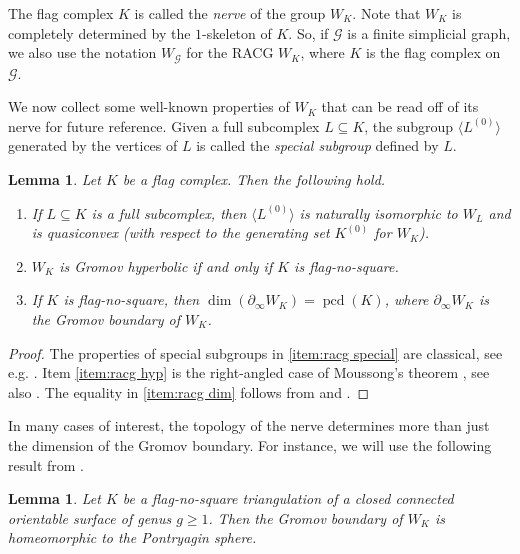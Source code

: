 \documentclass{amsart}
\theoremstyle{plain}
\newtheorem{lemma}[theorem]{Lemma}
\theoremstyle{definition}
\theoremstyle{remark}
\numberwithin{equation}{section}
\newcommand{\pcd}{\operatorname{pcd}}
\newcommand{\grbd}{\partial_\infty} %
\renewcommand{\geq}{\geqslant}
\begin{document}
The flag complex $K$ is called the \textit{nerve} of the group $W_K$. 
Note that $W_K$ is completely determined by the $1$-skeleton of $K$. 
So, if $\mathscr{G}$ is a finite simplicial graph, we also use the notation $W_{\mathscr{G}}$ for the RACG $W_K$, where $K$ is the flag complex on $\mathscr{G}$.


We now collect some well-known properties of $W_K$ that can be read off of its nerve for future reference.
Given a full subcomplex  $L\subseteq K$, the subgroup  $\langle L^{(0)} \rangle$ generated by the vertices of $L$ is called the \textit{special subgroup} defined by $L$.
\begin{lemma}\label{lem:racg}
    Let $K$ be a flag complex. Then the following hold.
    \begin{enumerate}
    \item \label{item:racg special} If $L\subseteq K$ is a  full subcomplex, then $\langle L^{(0)}\rangle$ is naturally isomorphic to $W_L$ and is quasiconvex (with respect to the generating set $K^{(0)}$ for $W_K$).
    
    \item \label{item:racg hyp} $W_K$ is Gromov hyperbolic if and only if $K$ is flag-no-square.

    \item \label{item:racg dim} If $K$ is flag-no-square, then  $\dim(\grbd W_K)=\pcd(K)$, where $\grbd W_K$ is the Gromov boundary of $W_K$.
    \end{enumerate}
\end{lemma}
\begin{proof}
The properties of special subgroups in \eqref{item:racg special} are classical, see e.g. \cite[\S 4.1]{DA08}. 
    Item \eqref{item:racg hyp} is the right-angled case of Moussong's theorem \cite{moussong}, see also \cite[Corollary 12.6.3]{DA08}.
    The equality in \eqref{item:racg dim} follows from  \cite[Corollary 1.4.(e)]{BM91} and \cite[Corollary 8.5.5]{DA08}.
\end{proof}

In many cases of interest, the topology of the nerve determines more than just the dimension of the Gromov boundary. 
For instance, we will use the following result from \cite{FI03}.

\begin{lemma}\label{lem:pontryagin}
 Let $K$ be a flag-no-square triangulation of a closed connected orientable surface of genus $g\geq 1$.   
 Then the Gromov boundary of $W_K$ is homeomorphic to the Pontryagin sphere.
\end{lemma}
\end{document}
